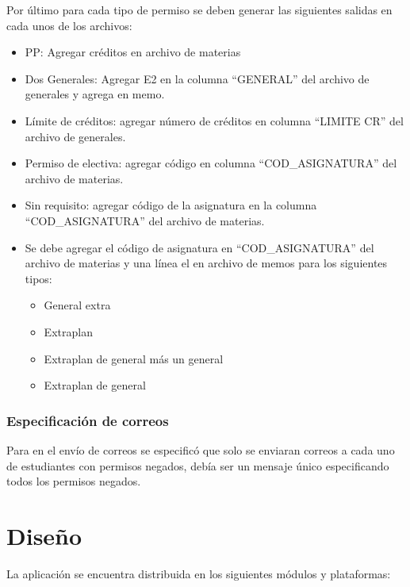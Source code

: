 \documentclass[]{article}
\begin{document}
Por último para cada tipo de permiso se deben generar las siguientes
salidas en cada unos de los archivos:

\begin{itemize}
\itemsep1pt\parskip0pt
\item
  PP: Agregar créditos en archivo de materias
\item
  Dos Generales: Agregar E2 en la columna ``GENERAL'' del archivo de
  generales y agrega en memo.
\item
  Límite de créditos: agregar número de créditos en columna ``LIMITE
  CR'' del archivo de generales.
\item
  Permiso de electiva: agregar código en columna ``COD\_ASIGNATURA'' del
  archivo de materias.
\item
  Sin requisito: agregar código de la asignatura en la columna
  ``COD\_ASIGNATURA'' del archivo de materias.
\item
  Se debe agregar el código de asignatura en ``COD\_ASIGNATURA'' del
  archivo de materias y una línea el en archivo de memos para los
  siguientes tipos:

  \begin{itemize}
  \itemsep1pt\parskip0pt
  \item
    General extra
  \item
    Extraplan
  \item
    Extraplan de general más un general
  \item
    Extraplan de general
  \end{itemize}
\end{itemize}

\subsubsection{Especificación de
correos}\label{especificaciuxf3n-de-correos}

Para en el envío de correos se especificó que solo se enviaran correos a
cada uno de estudiantes con permisos negados, debía ser un mensaje único
especificando todos los permisos negados.

\section{Diseño}\label{diseuxf1o}

La aplicación se encuentra distribuida en los siguientes módulos y
plataformas:
\end{document}
